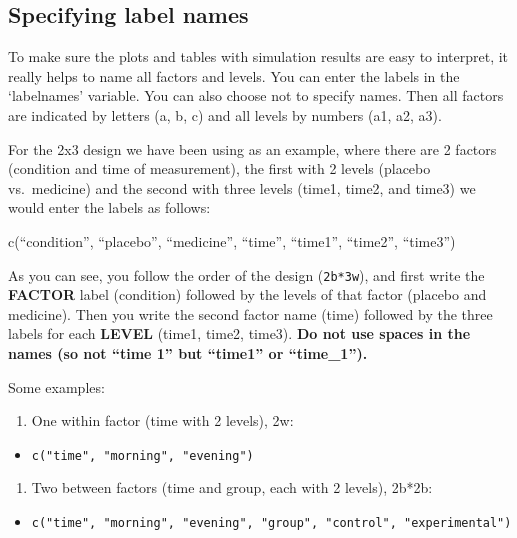 \documentclass[]{book}
\providecommand{\tightlist}{%
  \setlength{\itemsep}{0pt}\setlength{\parskip}{0pt}}
\begin{document}
\hypertarget{specifying-label-names}{%
\subsection{Specifying label names}\label{specifying-label-names}}

To make sure the plots and tables with simulation results are easy to interpret, it really helps to name all factors and levels. You can enter the labels in the `labelnames' variable. You can also choose not to specify names. Then all factors are indicated by letters (a, b, c) and all levels by numbers (a1, a2, a3).

For the 2x3 design we have been using as an example, where there are 2 factors (condition and time of measurement), the first with 2 levels (placebo vs.~medicine) and the second with three levels (time1, time2, and time3) we would enter the labels as follows:

c(``condition'', ``placebo'', ``medicine'', ``time'', ``time1'', ``time2'', ``time3'')

As you can see, you follow the order of the design (\texttt{2b*3w}), and first write the \textbf{FACTOR} label (condition) followed by the levels of that factor (placebo and medicine). Then you write the second factor name (time) followed by the three labels for each \textbf{LEVEL} (time1, time2, time3). \textbf{Do not use spaces in the names (so not ``time 1'' but ``time1'' or ``time\_1'').}

Some examples:

\begin{enumerate}
\def\labelenumi{\arabic{enumi}.}
\tightlist
\item
  One within factor (time with 2 levels), 2w:
\end{enumerate}

\begin{itemize}
\tightlist
\item
  \texttt{c("time",\ "morning",\ "evening")}
\end{itemize}

\begin{enumerate}
\def\labelenumi{\arabic{enumi}.}
\setcounter{enumi}{1}
\tightlist
\item
  Two between factors (time and group, each with 2 levels), 2b*2b:
\end{enumerate}

\begin{itemize}
\tightlist
\item
  \texttt{c("time",\ "morning",\ "evening",\ "group",\ "control",\ "experimental")}
\end{itemize}
\end{document}
